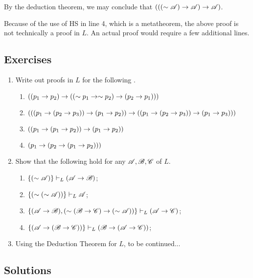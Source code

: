 \begin{proposition}
\begin{enumerate}[label=(\alph*)]
      By the deduction theorem, we may conclude that \((((\sim\mathscr{A}) \rightarrow \mathscr{A}) \rightarrow \mathscr{A})\).

      \note{} Because of the use of HS in line 4, which is a metatheorem, the above proof is not technically a proof in \(L\). An actual proof would require a few additional lines.
  \end{enumerate}
\end{proposition}

\subsection*{Exercises}

\begin{enumerate}
  \item Write out proofs in \(L\) for the following \wfs.

    \begin{enumerate}[label=(\alph*)]
      \item \(((p_1 \rightarrow p_2) \rightarrow ((\sim p_1 \rightarrow \sim p_2) \rightarrow (p_2 \rightarrow p_1)))\)
      \item \((((p_1 \rightarrow (p_2 \rightarrow p_3)) \rightarrow (p_1 \rightarrow p_2)) \rightarrow ((p_1 \rightarrow (p_2 \rightarrow p_3)) \rightarrow (p_1 \rightarrow p_3)))\)
      \item \(((p_1 \rightarrow (p_1 \rightarrow p_2)) \rightarrow (p_1 \rightarrow p_2))\)
      \item \((p_1 \rightarrow (p_2 \rightarrow (p_1 \rightarrow p_2)))\)
    \end{enumerate}

  \item Show that the following hold for any \wfs{} \(\mathscr{A}, \mathscr{B}, \mathscr{C}\) of \(L\).
  \begin{enumerate}
    \item \(\{(\sim\mathscr{A})\} \vdash_{L} (\mathscr{A} \rightarrow \mathscr{B})\);
    \item \(\{(\sim(\sim\mathscr{A}))\} \vdash_{L} \mathscr{A}\);
    \item \(\{(\mathscr{A} \rightarrow \mathscr{B}), (\sim(\mathscr{B} \rightarrow \mathscr{C}) \rightarrow (\sim\mathscr{A}))\} \vdash_{L} (\mathscr{A} \rightarrow \mathscr{C})\);
    \item \(\{(\mathscr{A} \rightarrow (\mathscr{B} \rightarrow \mathscr{C}))\} \vdash_{L} (\mathscr{B} \rightarrow (\mathscr{A} \rightarrow \mathscr{C}))\);
  \end{enumerate}

  \item Using the Deduction Theorem for \(L\), to be continued...
\end{enumerate}

\subsection*{Solutions}

